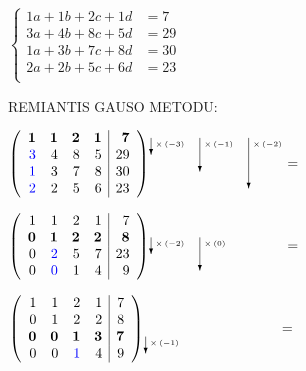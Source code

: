 \documentclass[a4paper]{article}
\begin{document}
$\left\{\begin{array}{lr}
1a + 1b + 2c + 1d &=7\\
3a + 4b + 8c + 5d &=29\\
1a + 3b + 7c + 8d &=30\\
2a + 2b + 5c + 6d &=23\\
\end{array}\right.$

REMIANTIS GAUSO METODU:

\noindent$\left(\begin{array}{rrrr|r}
\bm{1} & \bm{1} & \bm{2} & \bm{1} & \bm{7}\\
\textcolor{blue}{3} & 4 & 8 & 5 & 29\\
\textcolor{blue}{1} & 3 & 7 & 8 & 30\\
\textcolor{blue}{2} & 2 & 5 & 6 & 23\\
\end{array}\right)
\setlength{\unitlength}{1pt}
\begin{picture} (95, 0)
\put(0.0, 21.0){\vector(0, -1){12}}
\put(3.0, 15.0){\tiny{$\times\left(-3\right)$}}
\put(35.0, 21.0){\vector(0, -1){24}}
\put(38.0, 15.0){\tiny{$\times\left(-1\right)$}}
\put(70.0, 21.0){\vector(0, -1){36}}
\put(73.0, 15.0){\tiny{$\times\left(-2\right)$}}
\end{picture}=$

\noindent$\left(\begin{array}{rrrr|r}
1 & 1 & 2 & 1 & 7\\
\bm{0} & \bm{1} & \bm{2} & \bm{2} & \bm{8}\\
0 & \textcolor{blue}{2} & 5 & 7 & 23\\
0 & \textcolor{blue}{0} & 1 & 4 & 9\\
\end{array}\right)
\setlength{\unitlength}{1pt}
\begin{picture} (95, 0)
\put(0.0, 9.0){\vector(0, -1){12}}
\put(3.0, 3.0){\tiny{$\times\left(-2\right)$}}
\put(35.0, 9.0){\vector(0, -1){24}}
\put(38.0, 3.0){\tiny{$\times\left(0\right)$}}
\end{picture}=$

\noindent$\left(\begin{array}{rrrr|r}
1 & 1 & 2 & 1 & 7\\
0 & 1 & 2 & 2 & 8\\
\bm{0} & \bm{0} & \bm{1} & \bm{3} & \bm{7}\\
0 & 0 & \textcolor{blue}{1} & 4 & 9\\
\end{array}\right)
\setlength{\unitlength}{1pt}
\begin{picture} (95, 0)
\put(0.0, -3.0){\vector(0, -1){12}}
\put(3.0, -9.0){\tiny{$\times\left(-1\right)$}}
\end{picture}=$
\end{document}
